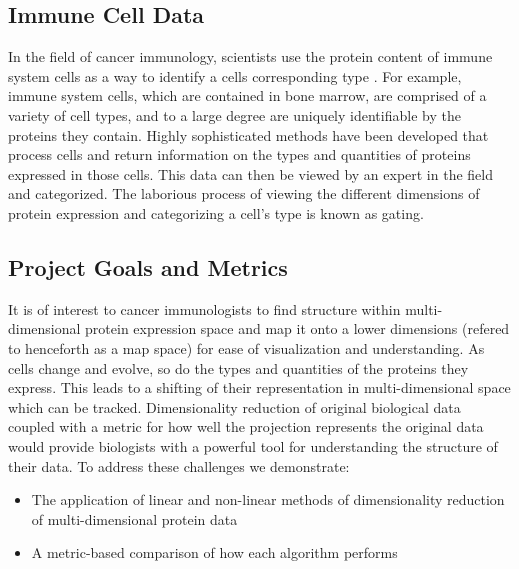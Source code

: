 \documentclass{article}
\begin{document}
\subsection{Immune Cell Data}

In the field of cancer immunology, scientists use the protein content of immune system cells as a way to identify a cells corresponding type \cite{Bendall:2011bm}. For example, immune system cells, which are contained in bone marrow, are comprised of a variety of cell types, and to a large degree are uniquely identifiable by the proteins they contain. Highly sophisticated methods have been developed that process cells and return information on the types and quantities of proteins expressed in those cells. This data can then be viewed by an expert in the field and categorized. The laborious process of viewing the different dimensions of protein expression and categorizing a cell's type is known as gating. 

%

\subsection{Project Goals and Metrics}

It is of interest to cancer immunologists to find structure within multi-dimensional protein expression space and map it onto a lower dimensions (refered to henceforth as a map space) for ease of visualization and understanding. As cells change and evolve, so do the types and quantities of the proteins they express. This leads to a shifting of their representation in multi-dimensional space which can be tracked. Dimensionality reduction of original biological data coupled with a metric for how well the projection represents the original data would provide biologists with a powerful tool for understanding the structure of their data. To address these challenges we demonstrate:

\begin{itemize}
\item The application of linear and non-linear methods of dimensionality reduction of multi-dimensional protein data
\item A metric-based comparison of how each algorithm performs
\end{itemize}
\end{document}
